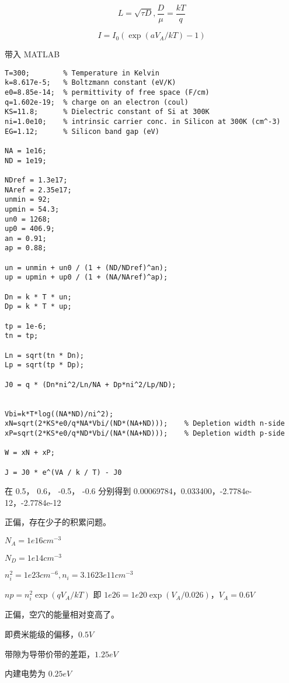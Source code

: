 \documentclass[lang=cn,11pt,a4paper,cite=authoryear]{elegantpaper}
\begin{document}
\[L = \sqrt{\tau D}, \frac{D}{\mu} = \frac{k T}{q}\]

\[I = I_0 (\exp(a V_A / k T) - 1)\]

带入 MATLAB 

\begin{lstlisting}
T=300;        % Temperature in Kelvin
k=8.617e-5;   % Boltzmann constant (eV/K)
e0=8.85e-14;  % permittivity of free space (F/cm)
q=1.602e-19;  % charge on an electron (coul)
KS=11.8;      % Dielectric constant of Si at 300K
ni=1.0e10;    % intrinsic carrier conc. in Silicon at 300K (cm^-3)
EG=1.12;      % Silicon band gap (eV) 

NA = 1e16;
ND = 1e19;

NDref = 1.3e17;
NAref = 2.35e17;
unmin = 92;
upmin = 54.3;
un0 = 1268;
up0 = 406.9;
an = 0.91;
ap = 0.88;

un = unmin + un0 / (1 + (ND/NDref)^an);
up = upmin + up0 / (1 + (NA/NAref)^ap);

Dn = k * T * un;
Dp = k * T * up;

tp = 1e-6;
tn = tp;

Ln = sqrt(tn * Dn);
Lp = sqrt(tp * Dp);

J0 = q * (Dn*ni^2/Ln/NA + Dp*ni^2/Lp/ND);


Vbi=k*T*log((NA*ND)/ni^2); 
xN=sqrt(2*KS*e0/q*NA*Vbi/(ND*(NA+ND)));    % Depletion width n-side
xP=sqrt(2*KS*e0/q*ND*Vbi/(NA*(NA+ND)));    % Depletion width p-side

W = xN + xP;

J = J0 * e^(VA / k / T) - J0
\end{lstlisting}

在 0.5， 0.6， -0.5， -0.6 分别得到 0.00069784，0.033400，-2.7784e-12，-2.7784e-12



 正偏，存在少子的积累问题。

 \(N_A = 1e16 cm^{-3}\)

 \(N_D = 1e14 cm^{-3}\)

 \(n_i^2 = 1e23 cm^{-6}, n_i = 3.1623e11 cm^{-3}\)

 \(np = n_i^2 \exp (q V_A/kT)\) 即 \(1e26 = 1e20 \exp (V_A / 0.026)\)，\(V_A = 0.6 V\)


 正偏，空穴的能量相对变高了。

 即费米能级的偏移，\(0.5 V\)

 带隙为导带价带的差距，\(1.25 eV\)

 内建电势为 \(0.25 eV\)




\end{document}
